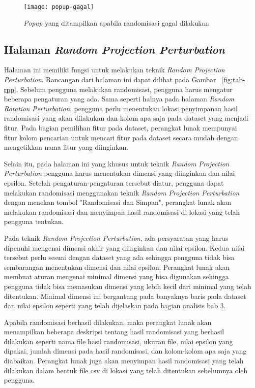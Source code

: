 \begin{figure}
	\centering
	\texttt{[image: popup-gagal]}
	\caption{\textit{Popup} yang ditampilkan apabila randomisasi gagal dilakukan}
	\label{fig:popup-gagal}
\end{figure}

\subsection{Halaman \textit{Random Projection Perturbation}}
\label{subsec:tabrpp}

Halaman ini memiliki fungsi untuk melakukan teknik \textit{Random Projection Perturbation}. Rancangan dari halaman ini dapat dilihat pada Gambar ~\ref{fig:tab-rpp}. Sebelum pengguna melakukan randomisasi, pengguna harus mengatur beberapa pengaturan yang ada. Sama seperti halnya pada halaman \textit{Random Rotation Perturbation}, pengguna perlu menentukan lokasi penyimpanan hasil randomisasi yang akan dilakukan dan kolom apa saja pada dataset yang menjadi fitur. Pada bagian pemilihan fitur pada dataset, perangkat lunak mempunyai fitur kolom pencarian untuk mencari fitur pada dataset secara mudah dengan mengetikkan nama fitur yang diinginkan.

Selain itu, pada halaman ini yang khusus untuk teknik \textit{Random Projection Perturbation} pengguna harus menentukan dimensi yang diinginkan dan nilai epsilon. Setelah pengaturan-pengaturan tersebut diatur, pengguna dapat melakukan randomisasi menggunakan teknik \textit{Random Projection Perturbation} dengan menekan tombol "Randomisasi dan Simpan", perangkat lunak akan melakukan randomisasi dan menyimpan hasil randomisasi di lokasi yang telah pengguna tentukan. 

Pada teknik \textit{Random Projection Perturbation}, ada persyaratan yang harus dipenuhi mengenai dimensi akhir yang diinginkan dan nilai epsilon. Kedua nilai tersebut perlu sesuai dengan dataset yang ada sehingga pengguna tidak bisa sembarangan menentukan dimensi dan nilai epsilon. Perangkat lunak akan membuat aturan mengenai minimal dimensi yang bisa digunakan sehingga pengguna tidak bisa memasukan dimensi yang lebih kecil dari minimal yang telah ditentukan. Minimal dimensi ini bergantung pada banyaknya baris pada dataset dan nilai epsilon seperti yang telah dijelaskan pada bagian analisis bab 3.

Apabila randomisasi berhasil dilakukan, maka perangkat lunak akan menampilkan beberapa deskripsi tentang hasil randomisasi yang berhasil dilakukan seperti nama file hasil randomisasi, ukuran file, nilai epsilon yang dipakai, jumlah dimensi pada hasil randomisasi, dan kolom-kolom apa saja yang diabaikan. Perangkat lunak juga akan menyimpan hasil randomisasi yang telah dilakukan dalam bentuk file csv di lokasi yang telah ditentukan sebelumnya oleh pengguna.

